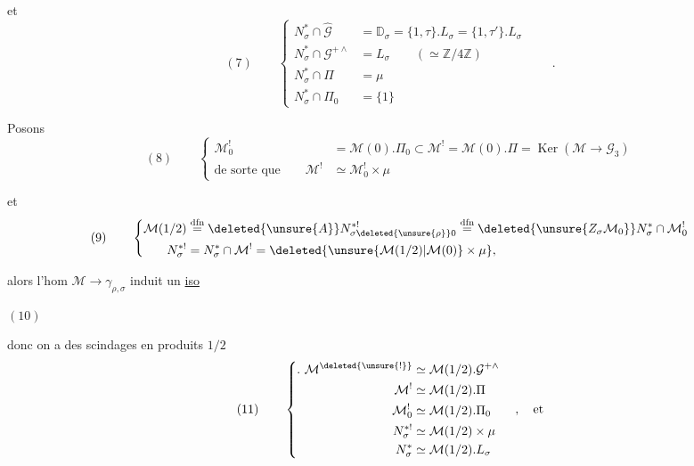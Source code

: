  et
\[
(7)\qquad
\left\{\begin{aligned}
N_\sigma^*\cap\widehat{\mathcal G}
  &=\mathbb D_\sigma=\{1,\tau\}.L_\sigma=\{1,\tau'\}.L_\sigma\\
N_\sigma^*\cap\mathcal G^{+\wedge}
  &= L_\sigma\qquad(\simeq\mathbb Z/4\mathbb Z)\\
N_\sigma^*\cap\Pi&=\mu\\
N_\sigma^*\cap\Pi_0&=\{1\}
\end{aligned}\right.
\qquad .
\]


Posons
\[
(8)\qquad
\left\{\begin{aligned}
\mathcal M_0^!&=\mathcal M(0).\Pi_0
\subset\mathcal M^!=\mathcal M(0).\Pi
=\operatorname{Ker}(\mathcal M\to\mathcal G_3)\\
\text{de sorte que}\qquad
\mathcal M^!&\simeq\mathcal M_0^!\times\mu
\end{aligned}\right.
\]

et
\[
(9)\qquad
\left\{\begin{aligned}
\mathcal M(1/2)
&\overset{\mathrm{dfn}}=
\deleted{\unsure{A}}N_{\sigma\deleted{\unsure{\rho}}0}^{*!}
\overset{\mathrm{dfn}}=
\deleted{\unsure{Z_\sigma\mathcal M_0}}N_\sigma^*\cap\mathcal M_0^!\\
N_\sigma^{*!}&=N_\sigma^*\cap\mathcal M^!
=\deleted{\unsure{\mathcal M(1/2)|\mathcal M(0)}\times\mu},
\end{aligned}\right.
\]

alors l'hom  $\mathcal M\to\gamma_{\rho,\sigma}$
induit un \uline{iso}

\begin{samepage}
\( (10) \)\quad
{}
\end{samepage}

donc on a des scindages en produits $1/2$ 
\[
(11)\qquad
\left\{\begin{aligned}
.\ \mathcal M^{\deleted{\unsure{!}}}
  &\simeq\mathcal M(1/2).\mathcal G^{+\wedge}\\
\mathcal M^!&\simeq\mathcal M(1/2).\Pi\\
\mathcal M_0^!&\simeq\mathcal M(1/2).\Pi_0\\
N_\sigma^{*!}&\simeq\mathcal M(1/2)\times\mu\\
N_\sigma^*&\simeq\mathcal M(1/2).L_\sigma
\end{aligned}\right.\quad,\quad\text{et}
\]

